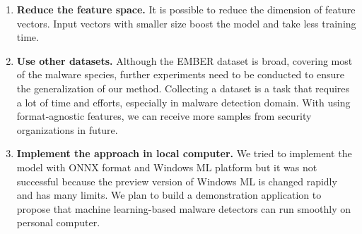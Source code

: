\begin{enumerate}
    \item \textbf{Reduce the feature space. } It is possible to reduce the dimension of feature vectors. Input vectors with smaller size boost the model and take less training time. 
    \item \textbf{Use other datasets. } Although the EMBER dataset is broad, covering most of the malware species, further experiments need to be conducted to ensure the generalization of our method. Collecting a dataset is a task that requires a lot of time and efforts, especially in malware detection domain. With using format-agnostic features, we can receive more samples from security organizations in future. 
    \item \textbf{Implement the approach in local computer. } We tried to implement the model with ONNX format and Windows ML platform but it was not successful because the preview version of Windows ML is changed rapidly and has many limits. We plan to build a demonstration application to propose that machine learning-based malware detectors can run smoothly on personal computer.
\end{enumerate}


